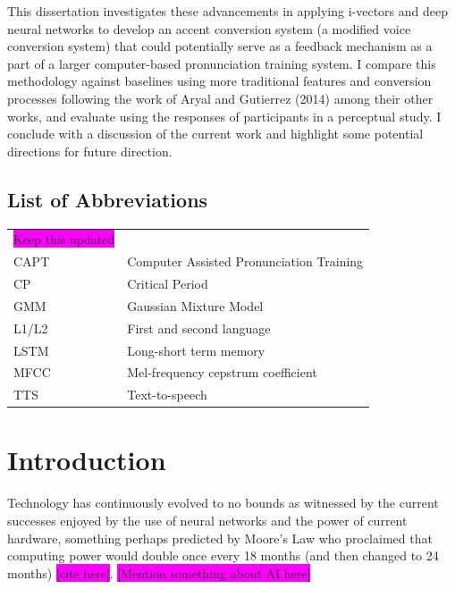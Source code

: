 \documentclass
[
    a4paper,
    twoside,
    12pt,
]
{report}
\begin{document}
This dissertation investigates these advancements in applying i-vectors
and deep neural networks to develop an accent conversion system (a
modified voice conversion system) that could potentially serve as a
feedback mechanism as a part of a larger computer-based pronunciation
training system. I compare this methodology against baselines using more
traditional features and conversion processes following the work of
Aryal and Gutierrez (2014) among their other works, and evaluate using
the responses of participants in a perceptual study. I conclude with a
discussion of the current work and highlight some potential directions
for future direction.
\cleardoublepage
\tableofcontents
{}
\clearpage
\listoffigures
{}

\section*{List of Abbreviations}
\begin{tabular}{ll}
    \colorbox{magenta}{Keep this updated} \\
    CAPT    & Computer Assisted Pronunciation Training \\
    CP      & Critical Period \\
    GMM     & Gaussian Mixture Model \\
    L1/L2    & First and second language \\
    LSTM & Long-short term memory \\
    MFCC & Mel-frequency cepstrum coefficient \\ 
    TTS   & Text-to-speech \\
    
\end{tabular}

\clearpage
\cleardoublepage
{}
\setcounter{page}{1}

\chapter{Introduction}

Technology has continuously evolved to no bounds as witnessed by the
current successes enjoyed by the use of neural networks and the power of
current hardware, something perhaps predicted by Moore's Law who
proclaimed that computing power would double once every 18 months (and
then changed to 24 months) \colorbox{magenta}{[cite here]}.
\colorbox{magenta}{[Mention something about AI here]}
\end{document}
